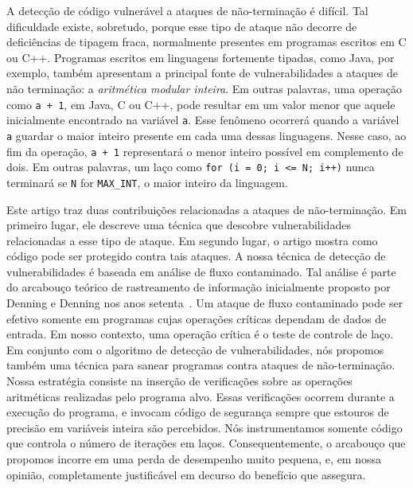 \documentclass{llncs}
\begin{document}
A detecção de código vulnerável a ataques de não-terminação é difícil.
Tal dificuldade existe, sobretudo, porque esse tipo de ataque não decorre de
deficiências de tipagem fraca, normalmente presentes em programas escritos em
C ou C++.
Programas escritos em linguagens fortemente tipadas, como Java, por exemplo,
também apresentam a principal fonte de vulnerabilidades a ataques de
não terminação: a {\em aritmética modular inteira}.
Em outras palavras, uma operação como \texttt{a + 1}, em Java, C ou C++, pode
resultar em um valor menor que aquele inicialmente encontrado na variável
\texttt{a}.
Esse fenômeno ocorrerá quando a variável \texttt{a} guardar o maior inteiro
presente em cada uma dessas linguagens.
Nesse caso, ao fim da operação, \texttt{a + 1} representará o menor inteiro
possível em complemento de dois.
Em outras palavras, um laço como \texttt{for (i = 0; i <= N; i++)} nunca
terminará se \texttt{N} for \texttt{MAX\_INT}, o maior inteiro da linguagem.

Este artigo traz duas contribuições relacionadas a ataques de não-terminação.
Em primeiro lugar, ele descreve uma técnica que descobre vulnerabilidades
relacionadas a esse tipo de ataque.
Em segundo lugar, o artigo mostra como código pode ser protegido contra tais
ataques.
A nossa técnica de detecção de vulnerabilidades é baseada em análise de
fluxo contaminado.
Tal análise é parte do arcabouço teórico de rastreamento de informação
inicialmente proposto por Denning e Denning nos anos setenta~\cite{Denning77}.
Um ataque de fluxo contaminado pode ser efetivo somente em programas cujas
operações críticas dependam de dados de entrada.
Em nosso contexto, uma operação crítica é o teste de controle de laço.
Em conjunto com o algoritmo de detecção de vulnerabilidades, nós propomos
também uma técnica para sanear programas contra ataques de não-terminação.
Nossa estratégia consiste na inserção de verificações sobre as
operações aritméticas realizadas pelo programa alvo.
Essas verificações ocorrem durante a execução do programa, e invocam código de
segurança sempre que estouros de precisão em variáveis inteira são percebidos.
Nós instrumentamos somente código que controla o número de iterações em laços.
Consequentemente, o arcabouço que propomos incorre em uma perda de
desempenho muito pequena, e, em nossa opinião, completamente justificável em
decurso do benefício que assegura.
\end{document}
